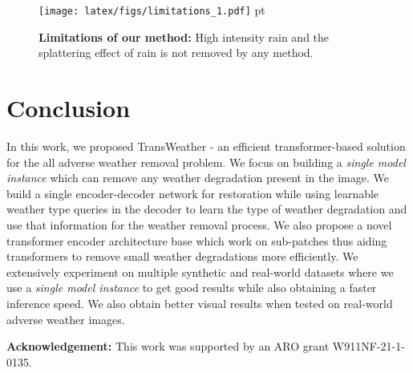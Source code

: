 \documentclass[10pt,twocolumn,letterpaper]{article}
\begin{document}
\begin{figure}[t]
	\centering
	\texttt{[image: latex/figs/limitations\_1.pdf]} 
	 pt
	\caption{\textbf{Limitations of our method:} High intensity rain and the splattering effect of rain is not removed by any method.  }
	\label{limitation}
	\vspace{-2.3em}
\end{figure}
\vspace{-1em}

\section{Conclusion}
In this work, we proposed TransWeather - an efficient transformer-based solution for the all adverse weather removal problem. We focus on building a \textit{single model instance} which can remove any weather degradation present in the image. We build a single encoder-decoder network for restoration while using learnable weather type queries in the decoder to learn the type of weather degradation and use that information for the weather removal process. We also propose a novel transformer encoder architecture base which work on sub-patches thus aiding transformers to remove small weather degradations more efficiently. We extensively experiment on multiple synthetic and real-world datasets where we use a \textit{single model instance} to get good results while also obtaining a faster inference speed. We also obtain better visual results when tested on real-world adverse weather images.

\noindent \textbf{Acknowledgement:} This work was supported by an ARO grant W911NF-21-1-0135.





{\small
	
	
}
\end{document}
